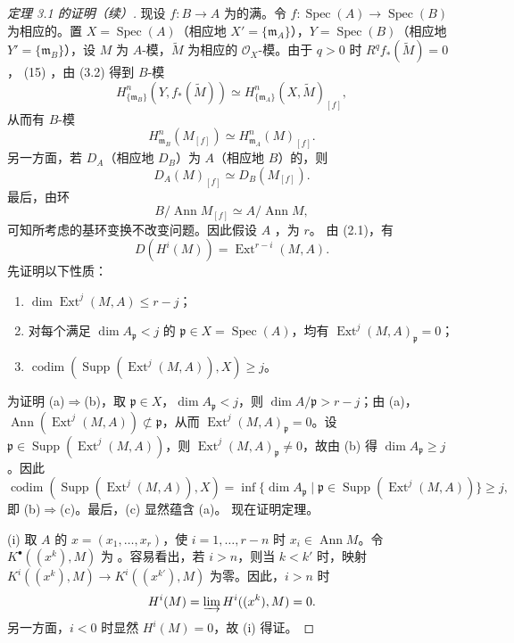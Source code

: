 \begin{proof}[定理 3.1 的证明（续）]
现设 $f:B\to A$ 为的满。令 $f:\operatorname{Spec}(A)\to\operatorname{Spec}(B)$ 为相应的。置 $X=\operatorname{Spec}(A)$（相应地 $X'=\{\mathfrak m_A\}$），$Y=\operatorname{Spec}(B)$（相应地 $Y'=\{\mathfrak m_B\}$），设 $M$ 为 $A$-模，$\widetilde M$ 为相应的 $\mathcal O_X$-模。由于 $q>0$ 时 $R^qf_*(\widetilde M)=0$， (15) ，由 (3.2) 得到 $B$-模
\[H^n_{\{\mathfrak m_B\}}(Y,f_*(\widetilde M))\simeq H^n_{\{\mathfrak m_A\}}(X,\widetilde M)_{[f]},\tag{18}\]
从而有 $B$-模
\[H^n_{\mathfrak m_B}(M_{[f]})\simeq H^n_{\mathfrak m_A}(M)_{[f]}.\tag{19}\]
另一方面，若 $D_A$（相应地 $D_B$）为 $A$（相应地 $B$）的，则
\[D_A(M)_{[f]}\simeq D_B(M_{[f]}).\tag{20}\]
最后，由环
\[B/\operatorname{Ann}M_{[f]}\simeq A/\operatorname{Ann}M,\tag{21}\]
可知所考虑的基环变换不改变问题。因此假设 $A$ ，为 $r$。
由 (2.1)，有
\[D(H^i(M))=\operatorname{Ext}^{r-i}(M,A).\tag{22}\]
先证明以下性质：
\begin{enumerate}
\item[(a)] $\dim\operatorname{Ext}^j(M,A)\le r-j$；
\item[(b)] 对每个满足 $\dim A_{\mathfrak p}<j$ 的 $\mathfrak p\in X=\operatorname{Spec}(A)$，均有 $\operatorname{Ext}^j(M,A)_{\mathfrak p}=0$；
\item[(c)] $\operatorname{codim}(\operatorname{Supp}(\operatorname{Ext}^j(M,A)),X)\ge j$。
\end{enumerate}
为证明 (a)$\Rightarrow$(b)，取 $\mathfrak p\in X$，$\dim A_{\mathfrak p}<j$，则 $\dim A/\mathfrak p>r-j$；由 (a)，$\operatorname{Ann}(\operatorname{Ext}^j(M,A))\not\subset\mathfrak p$，从而 $\operatorname{Ext}^j(M,A)_{\mathfrak p}=0$。设 $\mathfrak p\in\operatorname{Supp}(\operatorname{Ext}^j(M,A))$，则 $\operatorname{Ext}^j(M,A)_{\mathfrak p}\ne0$，故由 (b) 得 $\dim A_{\mathfrak p}\ge j$。因此
\[\operatorname{codim}(\operatorname{Supp}(\operatorname{Ext}^j(M,A)),X)=\inf\{\dim A_{\mathfrak p}\mid\mathfrak p\in\operatorname{Supp}(\operatorname{Ext}^j(M,A))\}\ge j,\]
即 (b)$\Rightarrow$(c)。最后，(c) 显然蕴含 (a)。
现在证明定理。

(i) 取 $A$ 的 $x=(x_1,\ldots,x_r)$，使 $i=1,\ldots,r-n$ 时 $x_i\in\operatorname{Ann}M$。令 $K^{\bullet}((x^k),M)$ 为 。容易看出，若 $i>n$，则当 $k<k'$ 时，映射 $K^i((x^k),M)\to K^i((x^{k'}),M)$ 为零。因此，$i>n$ 时
\[H^i(M)=\varinjlim H^i((x^k),M)=0.\]
另一方面，$i<0$ 时显然 $H^i(M)=0$，故 (i) 得证。


\end{proof}
